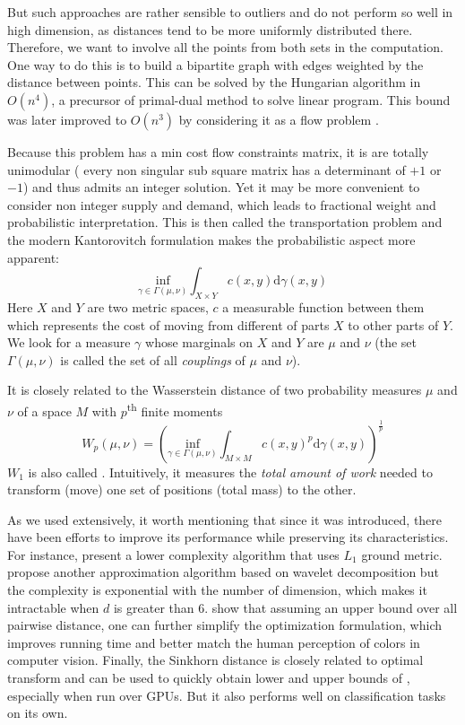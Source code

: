 But such approaches are rather sensible to outliers and do not perform so well
in high dimension, as distances tend to be more uniformly distributed there.
Therefore, we want to involve all the points from both sets in the computation.
One way to do this is to build a bipartite graph with edges weighted by the
distance between points. This can be solved by the Hungarian algorithm
\autocite{Hungarian57} in $O(n^4)$, a precursor of primal-dual method to solve
linear program. This bound was later improved to $O(n^3)$ by considering it as
a flow problem \autocite{HungarianN372}.

Because this problem has a min cost flow constraints matrix, it is are totally
unimodular (\ie{} every non singular sub square matrix has a determinant of
$+1$ or $-1$) and thus admits an integer solution. Yet it may be more convenient
to consider non integer supply and demand, which leads to fractional weight and
probabilistic interpretation. This is then called the transportation problem
and the modern Kantorovitch formulation makes the probabilistic aspect more
apparent:
\begin{equation*}
 \underset{\gamma \in \Gamma(\mu, \nu)}{\mathrm{inf}}
 \int_{X\times Y} c(x,y)\mathrm{d}\gamma(x,y)
\end{equation*}
Here $X$ and $Y$ are two metric spaces, $c$ a measurable function between them
which represents the cost of moving from different of parts $X$ to other parts of $Y$.
We look for a measure $\gamma$ whose marginals on $X$ and $Y$ are $\mu$ and
$\nu$ (the set $\Gamma(\mu, \nu)$ is called the set of all \emph{couplings} of
$\mu$ and $\nu$).

It is closely related to the Wasserstein distance of
two probability measures $\mu$ and $\nu$ of a space $M$ with
$p$\textsuperscript{th} finite moments
\begin{equation*}
W_p(\mu, \nu) = \left( \underset{\gamma \in \Gamma(\mu, \nu)}{\mathrm{inf}}
\int_{M\times M} c(x,y)^p\mathrm{d}\gamma(x,y)\right)^{\frac{1}{p}}
\end{equation*}
$W_1$ is also called  \autocite{EMD98}.
Intuitively, it measures the {\em total amount of work} needed to transform
(move) one set of positions (total mass) to the other. 

As we used \emd{} extensively, it worth mentioning that since it was
introduced, there have been efforts to improve its performance while preserving
its characteristics. For instance, \textcite{Ling2007} present a lower
complexity algorithm that uses $L_1$ ground metric. \Textcite{Shirdhonkar2008}
propose another approximation algorithm based on wavelet decomposition but the
complexity is exponential with the number of dimension, which makes it
intractable when $d$ is greater than 6. \Textcite{Pele2009} show that assuming
an upper bound over all pairwise distance, one can further simplify the
optimization formulation, which improves running time and better match the
human perception of colors in computer vision. Finally, the Sinkhorn distance
\autocite{FastEMD13} is closely related to optimal transform and can be used to
quickly obtain lower and upper bounds of \emd{}, especially when run over GPUs.
But it also performs well on classification tasks on its own.


